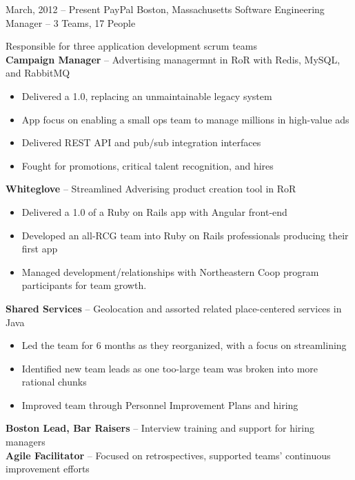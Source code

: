 \documentclass[]{friggeri-cv}
\begin{document}
\begin{entrylist}
  \entryalt
    {March, 2012 -- Present}
    {PayPal}
    {Boston, Massachusetts}
    {Software Engineering Manager -- 3 Teams, 17 People}
    {Responsible for three application development scrum teams \\
      \textbf{Campaign Manager} -- Advertising managermnt in RoR with Redis, MySQL,
      and RabbitMQ
    \begin{itemize}
      \item Delivered a 1.0, replacing an unmaintainable legacy system
      \item App focus on enabling a small ops team to manage millions in
        high-value ads
      \item Delivered REST API and pub/sub integration interfaces
      \item Fought for promotions, critical talent recognition, and hires
    \end{itemize}
      \textbf{Whiteglove} -- Streamlined Adverising product creation tool in RoR
    \begin{itemize}
      \item Delivered a 1.0 of a Ruby on Rails app with Angular front-end
      \item Developed an all-RCG team into Ruby on Rails professionals
        producing their first app
      \item Managed development/relationships with Northeastern Coop program
        participants for team growth.
    \end{itemize} 
      \textbf{Shared Services} -- Geolocation and assorted related place-centered
      services in Java
    \begin{itemize}
      \item Led the team for 6 months as they reorganized, with a focus on
        streamlining
      \item Identified new team leads as one too-large team was broken
        into more rational chunks
      \item Improved team through Personnel Improvement Plans and hiring
    \end{itemize}
    \textbf{Boston Lead, Bar Raisers} -- Interview training and support for hiring managers\\
    \textbf{Agile Facilitator} -- Focused on retrospectives, supported teams' continuous improvement efforts}


\end{entrylist}
\end{document}
